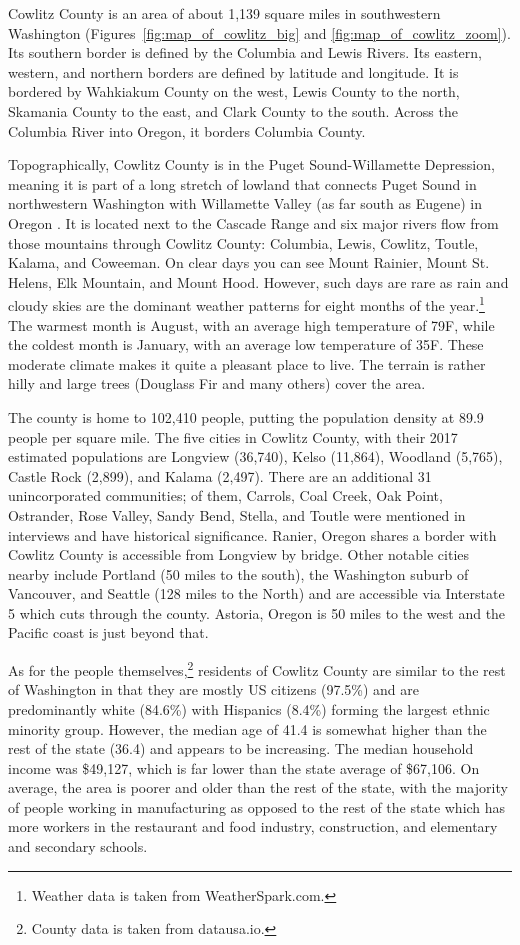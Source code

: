 Cowlitz County is an area of about 1,139 square miles in southwestern Washington (Figures~\ref{fig:map_of_cowlitz_big} and \ref{fig:map_of_cowlitz_zoom}). Its southern border is defined by the Columbia and Lewis Rivers. Its eastern, western, and northern borders are defined by latitude and longitude. It is bordered by Wahkiakum County on the west, Lewis County to the north, Skamania County to the east, and Clark County to the south. Across the Columbia River into Oregon, it borders Columbia County.

Topographically, Cowlitz County is in the Puget Sound-Willamette Depression, meaning it is part of a long stretch of lowland that connects Puget Sound in northwestern Washington with Willamette Valley (as far south as Eugene) in Oregon \citep[2]{barrier_froyalde_1998}. It is located next to the Cascade Range and six major rivers flow from those mountains through Cowlitz County: Columbia, Lewis, Cowlitz, Toutle, Kalama, and Coweeman. On clear days you can see Mount Rainier, Mount St. Helens, Elk Mountain, and Mount Hood. However, such days are rare as rain and cloudy skies are the dominant weather patterns for eight months of the year.\footnote{Weather data is taken from WeatherSpark.com.} The warmest month is August, with an average high temperature of 79\degree F, while the coldest month is January, with an average low temperature of 35\degree F. These moderate climate makes it quite a pleasant place to live. The terrain is rather hilly and large trees (Douglass Fir and many others) cover the area.

The county is home to 102,410 people, putting the population density at 89.9 people per square mile. The five cities in Cowlitz County, with their 2017 estimated populations \citep{census_factfinder} are Longview (36,740), Kelso (11,864), Woodland (5,765), Castle Rock (2,899), and Kalama (2,497). There are an additional 31 unincorporated communities; of them, Carrols, Coal Creek, Oak Point, Ostrander, Rose Valley, Sandy Bend, Stella, and Toutle were mentioned in interviews and have historical significance. Ranier, Oregon shares a border with Cowlitz County is accessible from Longview by bridge. Other notable cities nearby include Portland (50 miles to the south), the Washington suburb of Vancouver, and Seattle (128 miles to the North) and are accessible via Interstate 5 which cuts through the county. Astoria, Oregon is 50 miles to the west and the Pacific coast is just beyond that.

As for the people themselves,\footnote{County data is taken from datausa.io.} residents of Cowlitz County are similar to the rest of Washington in that they are mostly US citizens (97.5\%) and are predominantly white (84.6\%) with Hispanics (8.4\%) forming the largest ethnic minority group. However, the median age of 41.4 is somewhat higher than the rest of the state (36.4) and appears to be increasing. The median household income was \$49,127, which is far lower than the state average of \$67,106. On average, the area is poorer and older than the rest of the state, with the majority of people working in manufacturing as opposed to the rest of the state which has more workers in the restaurant and food industry, construction, and elementary and secondary schools.

